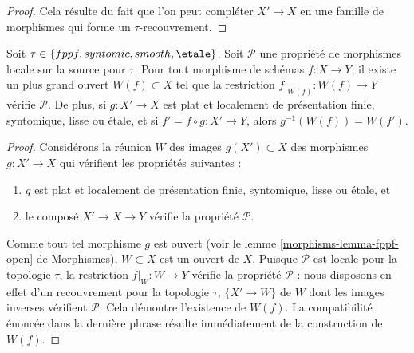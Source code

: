 \begin{proof}
Cela résulte du fait que l'on peut compléter $X' \to X$ en une famille de
morphismes qui forme un $\tau$-recouvrement.
\end{proof}

\begin{lemma}
\label{lemma-largest-open-of-the-source}
Soit $\tau \in \{fppf, syntomic, smooth, \etale\}$.
Soit $\mathcal{P}$ une propriété de morphismes locale sur la source pour
$\tau$. Pour tout morphisme de schémas $f : X \to Y$, il existe
un plus grand ouvert $W(f) \subset X$ tel que la restriction
$f|_{W(f)} : W(f) \to Y$ vérifie $\mathcal{P}$. De plus,
si $g : X' \to X$ est plat et localement de présentation finie,
syntomique, lisse ou \'etale, et si $f' = f \circ g : X' \to Y$, alors
$g^{-1}(W(f)) = W(f')$.
\end{lemma}

\begin{proof}
Considérons la réunion $W$ des images $g(X') \subset X$ des
morphismes $g : X' \to X$ qui vérifient les propriétés suivantes :
\begin{enumerate}
\item $g$ est plat et localement de présentation finie, syntomique,
lisse ou \'etale, et
\item le composé $X' \to X \to Y$ vérifie la propriété $\mathcal{P}$.
\end{enumerate}
Comme tout tel morphisme $g$ est ouvert (voir le
lemme \ref{morphisms-lemma-fppf-open} de Morphismes),
$W \subset X$ est un ouvert de $X$. Puisque $\mathcal{P}$ est locale pour la
topologie $\tau$, la restriction $f|_W : W \to Y$ vérifie la propriété
$\mathcal{P}$ : nous disposons en effet d'un recouvrement pour la topologie $\tau$,
$\{X' \to W\}$ de $W$ dont les images inverses vérifient $\mathcal{P}$.
Cela démontre l'existence de $W(f)$.
La compatibilité énoncée dans la dernière phrase résulte immédiatement de la
construction de $W(f)$.
\end{proof}

